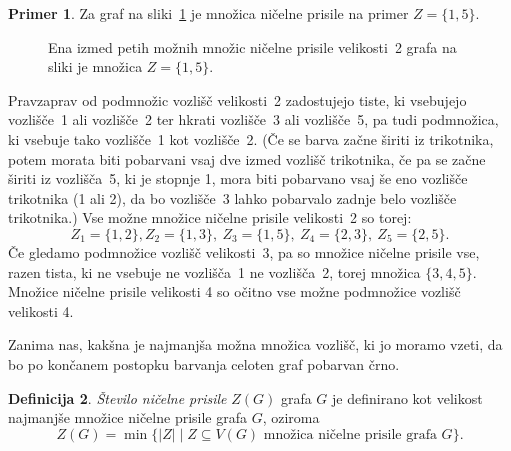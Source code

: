 \documentclass[12pt,a4paper,twoside]{article}
\theoremstyle{definition} %
\newtheorem{definicija}{Definicija}[section]
\newtheorem{primer}[definicija]{Primer}
\theoremstyle{plain} %
\numberwithin{equation}{section}  %
\begin{document}
\begin{primer}
    \label{prim:osnovni-zf}
    Za graf na sliki~\ref{fig:osnovni-primer-prisile} je množica ničelne prisile na primer $Z = \{ 1, 5\}$. 
    \begin{figure}[h]
        \centering
        \caption{Ena izmed petih možnih množic ničelne prisile velikosti~2 grafa na sliki je množica $Z =\{1,5\}$.}
        \label{fig:osnovni-primer-prisile}
    \end{figure}
    Pravzaprav od podmnožic vozlišč velikosti~2 zadostujejo tiste, ki vsebujejo vozlišče~1 ali vozlišče~2 ter hkrati vozlišče~3 ali vozlišče~5, pa tudi podmnožica, ki vsebuje tako vozlišče~1 kot vozlišče~2. (Če se barva začne širiti iz trikotnika, potem morata biti pobarvani vsaj dve izmed vozlišč trikotnika, če pa se začne širiti iz vozlišča~5, ki je stopnje 1, mora biti pobarvano vsaj še eno vozlišče trikotnika (1 ali 2), da bo vozlišče~3 lahko pobarvalo zadnje belo vozlišče trikotnika.) Vse možne množice ničelne prisile velikosti~2 so torej:
    \[ Z_1 = \{ 1, 2\}, Z_2 = \{ 1, 3\},\ Z_3 = \{ 1, 5\},\ Z_4 = \{ 2, 3\},\ Z_5 = \{2, 5\}. \]
    Če gledamo podmnožice vozlišč velikosti~3, pa so množice ničelne prisile vse, razen tista, ki ne vsebuje ne vozlišča~1 ne vozlišča~2, torej množica $\{3, 4, 5\}$. Množice ničelne prisile velikosti 4 so očitno vse možne podmnožice vozlišč velikosti 4.
\end{primer}

Zanima nas, kakšna je najmanjša možna množica vozlišč, ki jo moramo vzeti, da bo po končanem postopku barvanja celoten graf pobarvan črno. 

\begin{definicija}
    \emph{Število ničelne prisile} $Z(G)$ grafa $G$ je definirano kot velikost najmanjše množice ničelne prisile grafa $G$, oziroma
    \[ Z(G) = \min \{|Z| \mid Z \subseteq V(G) \text{ množica ničelne prisile grafa } G \}. \]
\end{definicija}
\end{document}
